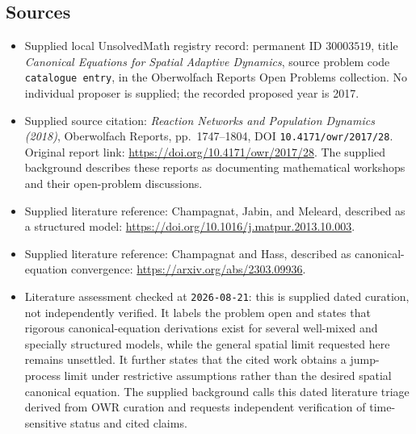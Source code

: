 \documentclass[11pt]{article}
\begin{document}
\subsection{Sources}
\begin{itemize}
\item Supplied local UnsolvedMath registry record: permanent ID \(30003519\), title \emph{Canonical Equations for Spatial Adaptive Dynamics}, source problem code \texttt{catalogue entry}, in the Oberwolfach Reports Open Problems collection. No individual proposer is supplied; the recorded proposed year is 2017.
\item Supplied source citation: \emph{Reaction Networks and Population Dynamics (2018)}, Oberwolfach Reports, pp.~1747--1804, DOI \texttt{10.4171/owr/2017/28}. Original report link: \url{https://doi.org/10.4171/owr/2017/28}. The supplied background describes these reports as documenting mathematical workshops and their open-problem discussions.
\item Supplied literature reference: Champagnat, Jabin, and Meleard, described as a structured model: \url{https://doi.org/10.1016/j.matpur.2013.10.003}.
\item Supplied literature reference: Champagnat and Hass, described as canonical-equation convergence: \url{https://arxiv.org/abs/2303.09936}.
\item Literature assessment checked at \texttt{2026-08-21}: this is supplied dated curation, not independently verified. It labels the problem open and states that rigorous canonical-equation derivations exist for several well-mixed and specially structured models, while the general spatial limit requested here remains unsettled. It further states that the cited work obtains a jump-process limit under restrictive assumptions rather than the desired spatial canonical equation. The supplied background calls this dated literature triage derived from OWR curation and requests independent verification of time-sensitive status and cited claims.
\end{itemize}
\end{document}
